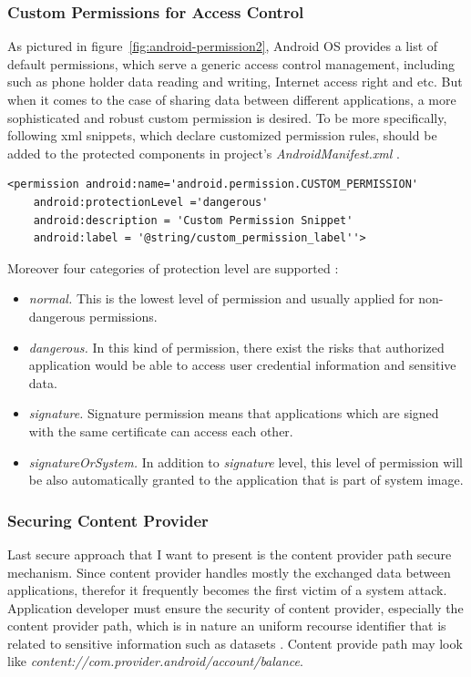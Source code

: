 \subsubsection{Custom Permissions for Access Control}

As pictured in figure~\ref{fig:android-permission2}, Android OS provides a list of default permissions, which serve a generic access control management, including such as  phone  holder data reading and writing, Internet access right and etc. But when it comes to the case of sharing data between different applications, a more sophisticated and robust custom permission is desired. To be more specifically, following xml snippets, which declare customized permission rules, should be added to the protected components in project's \emph{AndroidManifest.xml} \cite{android_secure_cook}.

\begin{Verbatim}[fontsize=\relsize{-1},frame=lines,framesep=4mm, label=\fbox{\small\emph{Custom Permission Snippet}}]
<permission android:name='android.permission.CUSTOM_PERMISSION'
	android:protectionLevel ='dangerous'
	android:description = 'Custom Permission Snippet'
	android:label = '@string/custom_permission_label''>
\end{Verbatim} 
Moreover four categories of protection level are supported \cite{android_secure_cook}:
\begin{itemize}
\item \emph{normal.} This is the lowest level of permission and usually applied for non-dangerous permissions. 
\item \emph{dangerous.}  In this kind of permission, there exist the risks that authorized application would be able to access user credential information and sensitive data.
\item \emph{signature.} Signature permission means that applications which are signed with the same certificate can access each other.
\item \emph{signatureOrSystem.} In addition to \emph{signature} level, this level of permission will be also automatically granted to the application that is part of system image.
\end{itemize}
\subsubsection{Securing Content Provider}
Last secure approach that I want to present is the content provider path  secure mechanism. Since content provider handles mostly the exchanged data between applications, therefor it frequently becomes the first victim of a system attack. Application developer must ensure the security of content provider, especially the content provider path, which is in nature an uniform recourse identifier that is related  to sensitive information such as datasets \cite{android_secure_cook}. Content provide path may look like \emph{content://com.provider.android/account/balance}.

